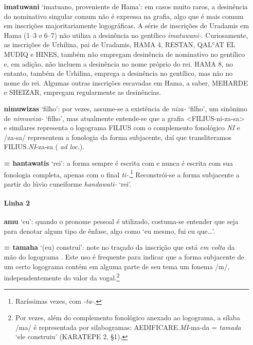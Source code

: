 \noindent\textbf{imatuwani} `imatuano, proveniente de Hama': em casos muito raros, a
desinência do nominativo singular comum não é expressa na grafia, algo que é
mais comum em inscrições majoritariamente logográficas. A série de inscrições de
Uradamis em Hama (1--3 e 6--7) não utiliza a desinência no gentílico
\emph{imatuwani-}.
Curiosamente, as inscrições de Urhilina, pai de Uradamis, HAMA 4,
RESTAN, QAL\textsc{ʿ}AT EL MUDIQ e HINES,
também não empregam desinência de nominativo no gentílico e, em adição, não
incluem a desinência no nome próprio do rei.
HAMA 8, no entanto, também de Urhilina, emprega a desinência no gentílico, mas
não no nome do rei.
Algumas outras inscrições escavadas em Hama, a saber, MEHARDE e SHEIZAR, empregam
regularmente as desinências.

\noindent\textbf{nimuwizas} `filho': por vezes, assume-se a existência de \emph{niza-}
`filho', um sinônimo de \emph{nimuwiza-} `filho', mas atualmente entende-se que
a grafia <FILIUS-ni-za-sa> e similares representa o logograma FILIUS com o
complemento fonológico \emph{NI} e /za-sa/ representem a fonologia da forma
subjacente, daí que transliteramos FILIUS.\emph{NI}-za-sa
( \emph{ad loc.}).

\noindent{} \textbf{= hantawatis} `rei': a forma sempre é escrita com  e
nunca é escrita com sua fonologia completa,
apenas com o final \emph{ti-}.\footnote{Raríssimas vezes, com \emph{-ta-}.}
Reconstrói-se a forma subjacente a partir do lúvio cuneiforme
\emph{handawati-} `rei'.

\paragraph{Linha 2}
\textbf{amu} `eu': quando o pronome pessoal é utilizado, costuma-se entender que
seja para denotar algum tipo de ênfase, algo como `eu mesmo, fui eu que\ldots{}'.

\noindent{} \textbf{= tamaha} `(eu) construí': note no
traçado da inscrição que  está \emph{em volta} da mão do
logograma . Este uso é frequente para indicar que a
forma subjacente de um certo logograma contém em alguma parte de seu tema um
fonema /m/, independentemente do valor da vogal.\footnote{Por vezes, além
	do complemento fonológico anexado ao logograma, a sílaba /ma/ é representada
	por silabogramas: AEDIFICARE.\emph{MI}-ma-da = \emph{tamada} `ele construiu'
	(KARATEPE 2, §1).}

